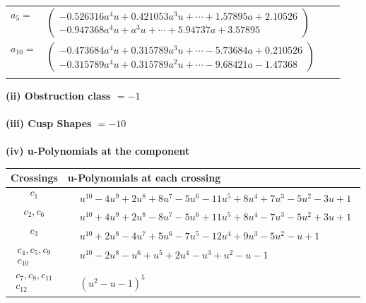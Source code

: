 \documentclass[1p]{elsarticle_modified}
\theoremstyle{definition}
\begin{document}
\begin{tabular}{m{7pt} m{180pt} m{7pt} m{180pt} }
\flushright $a_{5}=$&$\begin{pmatrix}-0.526316 a^{4} u+0.421053 a^{3} u+\cdots+1.57895 a+2.10526\\-0.947368 a^{4} u+a^{3} u+\cdots+5.94737 a+3.57895\end{pmatrix}$ \\
\flushright $a_{10}=$&$\begin{pmatrix}-0.473684 a^{4} u+0.315789 a^{3} u+\cdots-5.73684 a+0.210526\\-0.315789 a^{4} u+0.315789 a^{2} u+\cdots-9.68421 a-1.47368\end{pmatrix}$\\&\end{tabular}
\flushleft \textbf{(ii) Obstruction class $= -1$}\\~\\
\flushleft \textbf{(iii) Cusp Shapes $= -10$}\\~\\
\newpage\renewcommand{\arraystretch}{1}
\flushleft \textbf{(iv) u-Polynomials at the component}\newline \\
\begin{tabular}{m{50pt}|m{274pt}}
Crossings & \hspace{64pt}u-Polynomials at each crossing \\
\hline $$\begin{aligned}c_{1}\end{aligned}$$&$\begin{aligned}
&u^{10}-4 u^9+2 u^8+8 u^7-5 u^6-11 u^5+8 u^4+7 u^3-5 u^2-3 u+1
\end{aligned}$\\
\hline $$\begin{aligned}c_{2},c_{6}\end{aligned}$$&$\begin{aligned}
&u^{10}+4 u^9+2 u^8-8 u^7-5 u^6+11 u^5+8 u^4-7 u^3-5 u^2+3 u+1
\end{aligned}$\\
\hline $$\begin{aligned}c_{3}\end{aligned}$$&$\begin{aligned}
&u^{10}+2 u^8-4 u^7+5 u^6-7 u^5-12 u^4+9 u^3-5 u^2- u+1
\end{aligned}$\\
\hline $$\begin{aligned}c_{4},c_{5},c_{9}\\c_{10}\end{aligned}$$&$\begin{aligned}
&u^{10}-2 u^8- u^6+u^5+2 u^4- u^3+u^2- u-1
\end{aligned}$\\
\hline $$\begin{aligned}c_{7},c_{8},c_{11}\\c_{12}\end{aligned}$$&$\begin{aligned}
&(u^2- u-1)^5
\end{aligned}$\\
\hline
\end{tabular}\\~\\
\end{document}
